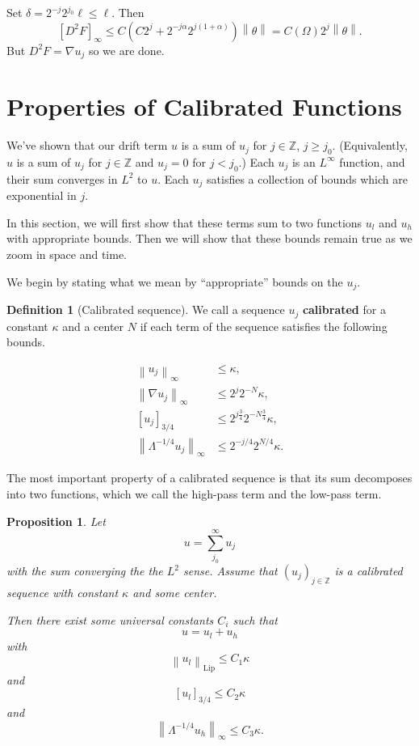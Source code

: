 \documentclass[11pt]{amsart}
\newtheorem{proposition}[theorem]{Proposition}
\theoremstyle{remark}
\theoremstyle{definition}
\newtheorem{definition}{Definition}
\newcommand{\Z}{\mathbb{Z}}
\newcommand{\norm}[1]{\left\lVert#1\right\rVert}
\newcommand{\paren}[1]{\left( #1 \right)}
\newcommand{\bracket}[1]{\left[ #1 \right]}
\newcommand{\grad}{\nabla}
\newcommand{\Lip}{\text{Lip}}
\newcommand{\ulow}{u_l}
\newcommand{\uhigh}{u_h}
\begin{document}
Set $\delta = 2^{-j} 2^{j_0} \ell \leq \ell$.  Then
\[ \bracket{D^2 F}_\infty \leq C \paren{C 2^j + 2^{-j\alpha} 2^{j(1+\alpha)}} \norm{\theta} = C(\Omega) 2^j \norm{\theta}. \]
But $D^2 F = \grad u_j$ so we are done.  



\section{Properties of Calibrated Functions} \label{sec:calibrated functions}
We've shown that our drift term $u$ is a sum of $u_j$ for $j \in \Z$, $j \geq j_0$.  (Equivalently, $u$ is a sum of $u_j$ for $j \in \Z$ and $u_j = 0$ for $j < j_0$.)  Each $u_j$ is an $L^\infty$ function, and their sum converges in $L^2$ to $u$.  Each $u_j$ satisfies a collection of bounds which are exponential in $j$.  

In this section, we will first show that these terms sum to two functions $\ulow$ and $\uhigh$ with appropriate bounds.  Then we will show that these bounds remain true as we zoom in space and time.  

We begin by stating what we mean by ``appropriate'' bounds on the $u_j$.  
\begin{definition}[Calibrated sequence]
We call a sequence $u_j$ \textbf{calibrated} for a constant $\kappa$ and a center $N$ if each term of the sequence satisfies the following bounds.  

\begin{align*}
\norm{u_j}_\infty &\leq \kappa, \\
\norm{\grad u_j}_\infty &\leq 2^{j} 2^{-N} \kappa, \\
\bracket{u_j}_{3/4} &\leq 2^{j \frac{3}{4}} 2^{- N \frac{3}{4}} \kappa, \\
\norm{\Lambda^{-1/4} u_j}_\infty &\leq 2^{-j/4} 2^{N/4} \kappa.  
\end{align*} 

\end{definition}

The most important property of a calibrated sequence is that its sum decomposes into two functions, which we call the high-pass term and the low-pass term.  

\begin{proposition} \label{thm:calibration is good}
Let 
\[ u = \sum_{j_0}^\infty u_j \]
with the sum converging the the $L^2$ sense.  Assume that $(u_j)_{j \in \Z}$ is a calibrated sequence with constant $\kappa$ and some center.  

Then there exist some universal constants $C_i$ such that
\[ u = \ulow + \uhigh \]
with 
\[ \norm{\ulow}_{\Lip} \leq C_1 \kappa\]
and
\[ \bracket{\ulow}_{3/4} \leq C_2 \kappa \]
and
\[ \norm{\Lambda^{-1/4} \uhigh}_\infty \leq C_3 \kappa. \]
\end{proposition}
\end{document}
